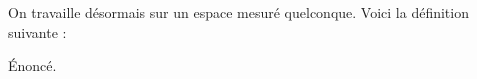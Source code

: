 On travaille désormais sur un espace mesuré quelconque.
Voici la définition suivante :
\begin{definition} %
  Énoncé.
\end{definition}
